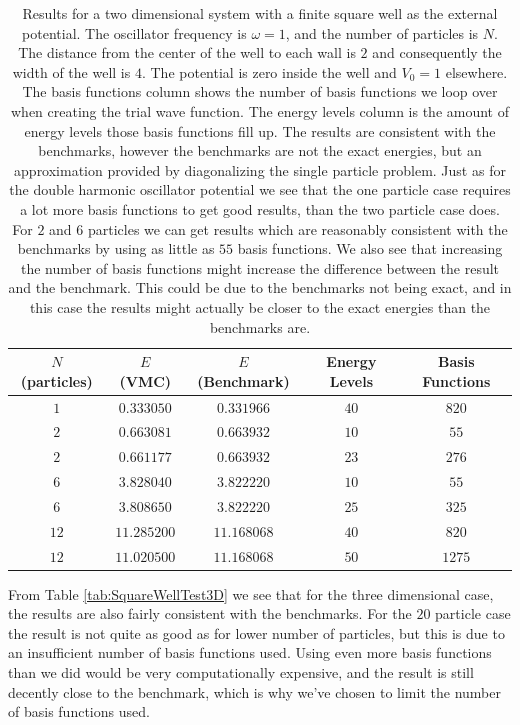 \documentclass[../main.tex]{subfiles}
\begin{document}
\begin{table}[!ht]
  \centering
  \begin{tabular}{ | c | c | c | c | c | }
    \hline
    $N$ (particles) & $E$ (VMC) & $E$ (Benchmark) &  Energy Levels & Basis Functions\\*
    \hline
    $1$ & $0.333050$ & $0.331966$ & $40$ & $820$ \\*
    \hline
    $2$ & $0.663081$ & $0.663932$ & $10$ & $55$ \\*
    \hline
    $2$ & $0.661177$ & $0.663932$ & $23$ & $276$ \\*
    \hline
    $6$ & $3.828040$ & $3.822220$ & $10$ & $55$ \\*
    \hline
    $6$ & $3.808650$ & $3.822220$ & $25$ & $325$ \\*
    \hline
    $12$ & $11.285200$ & $11.168068$ & $40$ & $820$ \\*
    \hline
    $12$ & $11.020500$ & $11.168068$ & $50$ & $1275$ \\*
    \hline
  \end{tabular}
  \caption{Results for a two dimensional system with a finite square well as the external potential. The oscillator frequency is $\omega = 1$, and the number of particles is $N$. The distance from the center of the well to each wall is $2$ and consequently the width of the well is $4$. The potential is zero inside the well and $V_0 = 1$ elsewhere. The basis functions column shows the number of basis functions we loop over when creating the trial wave function. The energy levels column is the amount of energy levels those basis functions fill up. The results are consistent with the benchmarks, however the benchmarks are not the exact energies, but an approximation provided by diagonalizing the single particle problem. Just as for the double harmonic oscillator potential we see that the one particle case requires a lot more basis functions to get good results, than the two particle case does. For $2$ and $6$ particles we can get results which are reasonably consistent with the benchmarks by using as little as $55$ basis functions. We also see that increasing the number of basis functions might increase the difference between the result and the benchmark. This could be due to the benchmarks not being exact, and in this case the results might actually be closer to the exact energies than the benchmarks are.}
  \label{tab:SquareWellTest2D}
\end{table}

From Table \ref{tab:SquareWellTest3D} we see that for the three dimensional case, the results are also fairly consistent with the benchmarks. For the $20$ particle case the result is not quite as good as for lower number of particles, but this is due to an insufficient number of basis functions used. Using even more basis functions than we did would be very computationally expensive, and the result is still decently close to the benchmark, which is why we've chosen to limit the number of basis functions used.
\end{document}
